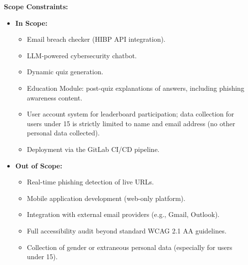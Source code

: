 \documentclass[11pt, a4paper]{report}
\begin{document}
\textbf{Scope Constraints:}
\begin{itemize}
    \item \textbf{In Scope:}
    \begin{itemize}
        \item Email breach checker (HIBP API integration).
        \item LLM-powered cybersecurity chatbot.
        \item Dynamic quiz generation.
        \item Education Module: post-quiz explanations of answers, including phishing awareness content.
        \item User account system for leaderboard participation; data collection for users under 15 is strictly limited to name and email address (no other personal data collected).
        \item Deployment via the GitLab CI/CD pipeline.
    \end{itemize}
    \item \textbf{Out of Scope:}
    \begin{itemize}
        \item Real-time phishing detection of live URLs.
        \item Mobile application development (web-only platform).
        \item Integration with external email providers (e.g., Gmail, Outlook).
        \item Full accessibility audit beyond standard WCAG 2.1 AA guidelines.
        \item Collection of gender or extraneous personal data (especially for users under 15).
    \end{itemize}
\end{itemize}
\end{document}
